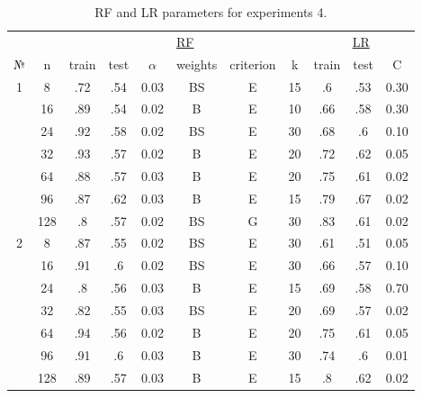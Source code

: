 \begin{table}
\centering
\caption{RF and LR parameters for experiments 4.}
\label{tab:params_4_rf_lr}
\begin{tabular}{|c|c|cccccc||ccc|}\hline
& & \multicolumn{6}{c||}{\underline{RF}} & \multicolumn{3}{c|}{\underline{LR}}\\
№ &   n & train & test & $\alpha$ & weights & criterion &  k & train & test &    C \\\hline
1 &   8 &   .72 &  .54 &     0.03 &      BS &         E & 15 &    .6 &  .53 & 0.30 \\
  &  16 &   .89 &  .54 &     0.02 &       B &         E & 10 &   .66 &  .58 & 0.30 \\
  &  24 &   .92 &  .58 &     0.02 &      BS &         E & 30 &   .68 &   .6 & 0.10 \\
  &  32 &   .93 &  .57 &     0.02 &       B &         E & 20 &   .72 &  .62 & 0.05 \\
  &  64 &   .88 &  .57 &     0.03 &       B &         E & 20 &   .75 &  .61 & 0.02 \\
  &  96 &   .87 &  .62 &     0.03 &       B &         E & 15 &   .79 &  .67 & 0.02 \\
  & 128 &    .8 &  .57 &     0.02 &      BS &         G & 30 &   .83 &  .61 & 0.02 \\\hline
2 &   8 &   .87 &  .55 &     0.02 &      BS &         E & 30 &   .61 &  .51 & 0.05 \\
  &  16 &   .91 &   .6 &     0.02 &      BS &         E & 30 &   .66 &  .57 & 0.10 \\
  &  24 &    .8 &  .56 &     0.03 &       B &         E & 15 &   .69 &  .58 & 0.70 \\
  &  32 &   .82 &  .55 &     0.03 &      BS &         E & 20 &   .69 &  .57 & 0.02 \\
  &  64 &   .94 &  .56 &     0.02 &       B &         E & 20 &   .75 &  .61 & 0.05 \\
  &  96 &   .91 &   .6 &     0.03 &       B &         E & 30 &   .74 &   .6 & 0.01 \\
  & 128 &   .89 &  .57 &     0.03 &       B &         E & 15 &    .8 &  .62 & 0.02 \\\hline
\end{tabular}
\end{table}
